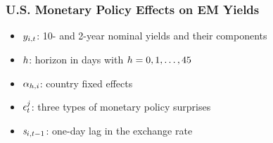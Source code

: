 \documentclass[12pt, aspectratio=169, xcolor=dvipsnames]{beamer}  %
\begin{document}
\begin{frame}
	\frametitle{U.S. Monetary Policy Effects on EM Yields}
	\vspace{-1cm}
	\vspace{-0.7cm}
	\begin{itemize}
		\item \(y_{i,t}\): 10- and 2-year nominal yields and their components
		\item \(h\): horizon in days with \(h = 0, 1, \ldots, 45\)
		\item \(\alpha_{h,i}\): country fixed effects
		\item \(\epsilon^{j}_{t}\): three types of monetary policy surprises
		\item \(\mathit{s}_{i,{t-1}}\): one-day lag in the exchange rate
	\end{itemize}
\end{frame}
\end{document}
